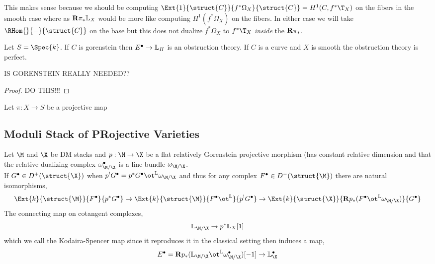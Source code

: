 \documentclass[12pt]{article}
\begin{document}
\begin{rmk}
This makes sense because we should be computing $\Ext{1}{\struct{C}}{f^* \Omega_X}{\struct{C}} = H^1(C, f^* \T_X)$ on the fibers in the smooth case where as $\mathbf{R} \pi_* \mathbb{L}_{X}$ would be more like computing $H^1(f^* \Omega_X)$ on the fibers. In either case we will take $\RHom{}{-}{\struct{C}}$ on the base but this does not dualize $f^* \Omega_X$ to $f^* \T_X$ \textit{inside} the $\mathbf{R} \pi_*$.
\end{rmk}

\begin{theorem}
Let $S = \Spec{k}$. If $C$ is gorenstein then $E^\bullet \to \mathbb{L}_{H}$ is an obstruction theory. If $C$ is a curve and $X$ is smooth the obstruction theory is perfect.
\end{theorem}

\begin{rmk}
IS GORENSTEIN REALLY NEEDED??
\end{rmk}

\begin{proof}
DO THIS!!!
\end{proof}

\begin{lemma}
Let $\pi : X \to S$ be a projective map 
\end{lemma}

\subsection{Moduli Stack of PRojective Varieties}

Let $\M$ and $\X$ be DM stacks and $p : \M \to \X$ be a flat relatively Gorenstein projective morphism (has constant relative dimension and that the relative dualizing complex $\omega_{\M/\X}^{\bullet}$ is a line bundle $\omega_{\M/\X}$. 
\bigskip\\
If $G^\bullet \in D^+(\struct{\X})$ when $p^! G^\bullet = p^* G^\bullet \ot^{\LL} \omega_{\M/\X}$ and thus for any complex $F^\bullet \in D^{-}(\struct{\M})$ there are natural isomorphisms,
\[ \Ext{k}{\struct{\M}}{F^\bullet}{p^* G^\bullet} \to \Ext{k}{\struct{\M}}{F^\bullet \ot^{\LL}}{p^! G^\bullet} \to \Ext{k}{\struct{\X}}{ \R p_* (F^\bullet \ot^{\LL} \omega_{\M/\X})}{G^\bullet} \]
The connecting map on cotangent complexes,
\[ \LL_{\M/\X} \to p^* \LL_{X}[1] \]
which we call the Kodaira-Spencer map since it reproduces it in the classical setting then induces a map,
\[ E^\bullet = \R p_* (\LL_{\M/\X} \ot^{\LL} \omega_{\M/\X}^\bullet)[-1] \to \LL_{\X}^\bullet \]
\end{document}
